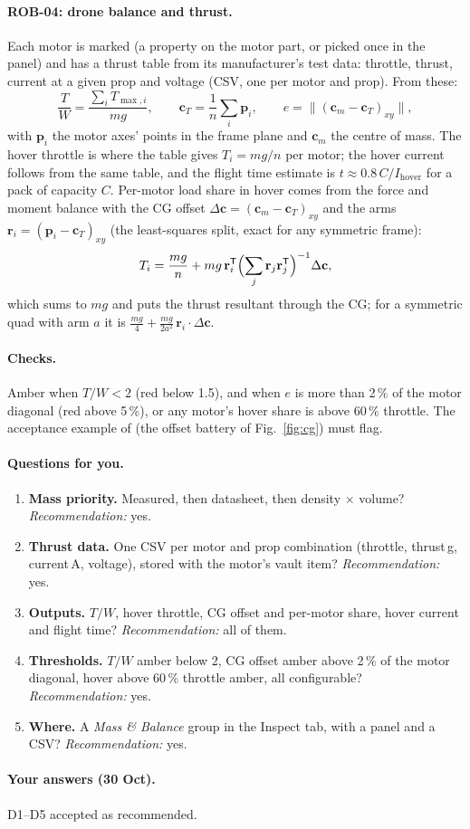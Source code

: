 \paragraph{ROB-04: drone balance and thrust.} Each motor is marked (a property  on the motor
part, or picked once in the panel) and has a thrust table from its manufacturer's test data: throttle, thrust,
current at a given prop and voltage (CSV, one per motor and prop). From these:
\[
  \frac{T}{W}=\frac{\sum_i T_{\max,i}}{mg},\qquad
  \mathbf c_T=\frac{1}{n}\sum_i \mathbf p_i,\qquad
  e=\lVert(\mathbf c_m-\mathbf c_T)_{xy}\rVert ,
\]
with $\mathbf p_i$ the motor axes' points in the frame plane and $\mathbf c_m$ the centre of mass. The hover
throttle is where the table gives $T_i=mg/n$ per motor; the hover current follows from the same table, and the
flight time estimate is $t\approx 0.8\,C/I_{\text{hover}}$ for a pack of capacity $C$. Per-motor load share in
hover comes from the force and moment balance with the CG offset $\Delta\mathbf c=(\mathbf c_m-\mathbf
c_T)_{xy}$ and the arms $\mathbf r_i=(\mathbf p_i-\mathbf c_T)_{xy}$ (the least-squares split, exact for any
symmetric frame):
\[
  T_i=\frac{mg}{n}+mg\,\mathbf r_i^{\mathsf T}\Bigl(\sum_j\mathbf r_j\mathbf r_j^{\mathsf T}\Bigr)^{-1}\Delta\mathbf c ,
\]
which sums to $mg$ and puts the thrust resultant through the CG; for a symmetric quad with arm $a$ it is
$\frac{mg}{4}+\frac{mg}{2a^2}\,\mathbf r_i\cdot\Delta\mathbf c$.

\paragraph{Checks.} Amber when $T/W<2$ (red below 1.5), and when $e$ is more than 2\,\% of the motor diagonal
(red above 5\,\%), or any motor's hover share is above 60\,\% throttle. The acceptance example of 
(the offset battery of Fig.~\ref{fig:cg}) must flag.

\paragraph{Questions for you.}
\begin{enumerate}[label=D\arabic*.]
  \item \textbf{Mass priority.} Measured, then datasheet, then density $\times$ volume?
        \emph{Recommendation:} yes.
  \item \textbf{Thrust data.} One CSV per motor and prop combination (throttle, thrust\,g, current\,A, voltage),
        stored with the motor's vault item? \emph{Recommendation:} yes.
  \item \textbf{Outputs.} $T/W$, hover throttle, CG offset and per-motor share, hover current and flight time?
        \emph{Recommendation:} all of them.
  \item \textbf{Thresholds.} $T/W$ amber below 2, CG offset amber above 2\,\% of the motor diagonal, hover above
        60\,\% throttle amber, all configurable? \emph{Recommendation:} yes.
  \item \textbf{Where.} A \emph{Mass \& Balance} group in the Inspect tab, with a panel and a CSV?
        \emph{Recommendation:} yes.
\end{enumerate}

\paragraph{Your answers (30 Oct).} D1--D5 accepted as recommended.
